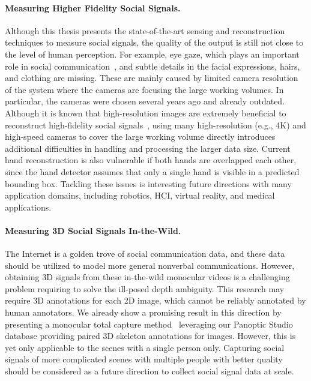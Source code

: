 \paragraph{Measuring Higher Fidelity Social Signals.}
Although this thesis presents the state-of-the-art sensing and reconstruction techniques to measure social signals, the quality of the output is still not close to the level of human perception. For example, eye gaze, which plays an important role in social communication~\cite{rayner1998eye,friesen1998eyes,ricciardelli2002my}, and subtle details in the facial expressions, hairs, and clothing are missing. These are mainly caused by limited camera resolution of the system where the cameras are focusing the large working volumes. In particular, the cameras were chosen several years ago and already outdated. Although it is known that high-resolution images are extremely beneficial to reconstruct high-fidelity social signals~\cite{beeler2010high,Beeler2011}, using many high-resolution (e.g., 4K) and high-speed cameras to cover the large working volume directly introduces additional difficulties in handling and processing the larger data size. Current hand reconstruction is also vulnerable if both hands are overlapped each other, since the hand detector assumes that only a single hand is visible in a predicted bounding box. Tackling these issues is interesting future directions with many application domains, including robotics, HCI, virtual reality, and medical applications.

\paragraph{Measuring 3D Social Signals In-the-Wild.}
The Internet is a golden trove of social communication data, and these data should be utilized to model more general nonverbal communications. However, obtaining 3D signals from these in-the-wild monocular videos is a challenging problem requiring to solve the ill-posed depth ambiguity. This research may require 3D annotations for each 2D image, which cannot be reliably annotated by human annotators. We already show a promising result in this direction by presenting a monocular total capture method~\cite{Xiang2019} leveraging our Panoptic Studio database providing paired 3D skeleton annotations for images. However, this is yet only applicable to the scenes with a single person only. Capturing social signals of more complicated scenes with multiple people with better quality should be considered as a future direction to collect social signal data at scale.

